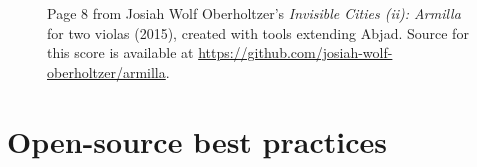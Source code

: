 \documentclass{article}
\begin{document}
\begin{figure}
    \centering
    \caption{
        Page 8 from Josiah Wolf Oberholtzer's \emph{Invisible Cities (ii):
        Armilla} for two violas (2015), created with tools extending Abjad.
        Source for this score is available at
        \url{https://github.com/josiah-wolf-oberholtzer/armilla}. }
\end{figure}

\section{Open-source best practices} \label{sec:open-source}
\end{document}
